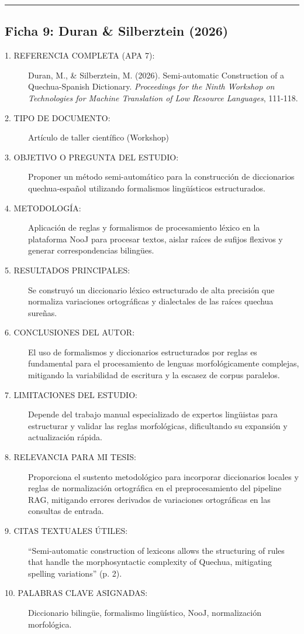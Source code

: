 \vspace{0.5cm}
\hrule
\vspace{0.5cm}

\subsection*{Ficha 9: Duran \& Silberztein (2026)}
\begin{description}
	\item[1. REFERENCIA COMPLETA (APA 7):] Duran, M., \& Silberztein, M. (2026). Semi-automatic Construction of a Quechua-Spanish Dictionary. \textit{Proceedings for the Ninth Workshop on Technologies for Machine Translation of Low Resource Languages}, 111-118.
	\item[2. TIPO DE DOCUMENTO:] Artículo de taller científico (Workshop)
	\item[3. OBJETIVO O PREGUNTA DEL ESTUDIO:] Proponer un método semi-automático para la construcción de diccionarios quechua-español utilizando formalismos lingüísticos estructurados.
	\item[4. METODOLOGÍA:] Aplicación de reglas y formalismos de procesamiento léxico en la plataforma NooJ para procesar textos, aislar raíces de sufijos flexivos y generar correspondencias bilingües.
	\item[5. RESULTADOS PRINCIPALES:] Se construyó un diccionario léxico estructurado de alta precisión que normaliza variaciones ortográficas y dialectales de las raíces quechua sureñas.
	\item[6. CONCLUSIONES DEL AUTOR:] El uso de formalismos y diccionarios estructurados por reglas es fundamental para el procesamiento de lenguas morfológicamente complejas, mitigando la variabilidad de escritura y la escasez de corpus paralelos.
	\item[7. LIMITACIONES DEL ESTUDIO:] Depende del trabajo manual especializado de expertos lingüistas para estructurar y validar las reglas morfológicas, dificultando su expansión y actualización rápida.
	\item[8. RELEVANCIA PARA MI TESIS:] Proporciona el sustento metodológico para incorporar diccionarios locales y reglas de normalización ortográfica en el preprocesamiento del pipeline RAG, mitigando errores derivados de variaciones ortográficas en las consultas de entrada.
	\item[9. CITAS TEXTUALES ÚTILES:] ``Semi-automatic construction of lexicons allows the structuring of rules that handle the morphosyntactic complexity of Quechua, mitigating spelling variations'' (p. 2).
	\item[10. PALABRAS CLAVE ASIGNADAS:] Diccionario bilingüe, formalismo lingüístico, NooJ, normalización morfológica.
\end{description}
